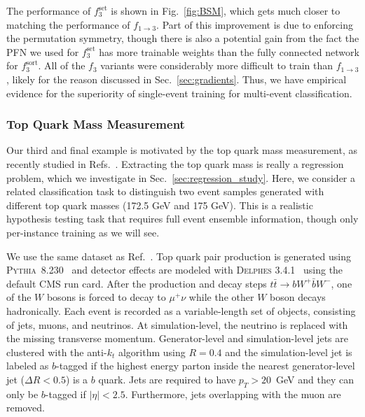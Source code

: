 \documentclass[aps,prx,reprint,preprintnumbers,superscriptaddress,nofootinbib,longbibliography,floatfix]{revtex4-2}
\DeclareRobustCommand{\Sec}[1]{Sec.~\ref{sec:#1}}
\DeclareRobustCommand{\Fig}[1]{Fig.~\ref{fig:#1}}
\DeclareRobustCommand{\Ref}[1]{Ref.~\cite{#1}}
\DeclareRobustCommand{\Refs}[1]{Refs.~\cite{#1}}
\begin{document}
The performance of $f^\text{set}_3$ is shown in \Fig{BSM}, which gets much closer to matching the performance of $f_{1\rightarrow 3}$.
%
Part of this improvement is due to enforcing the permutation symmetry, though there is also a potential gain from the fact the PFN we used for $f^\text{set}_3$ has more trainable weights than the fully connected network for $f^\text{sort}_3$.
%
All of the $f_3$ variants were considerably more difficult to train than $f_{1 \to 3}$, likely for the reason discussed in \Sec{gradients}.
%
Thus, we have empirical evidence for the superiority of single-event training for multi-event classification.
 

 
 \subsubsection{Top Quark Mass Measurement}
 \label{sec:manyfromone_top}


Our third and final example is motivated by the top quark mass measurement, as recently studied in \Refs{2010.03569,Flesher:2020kuy}.
%
Extracting the top quark mass is really a regression problem, which we investigate in \Sec{regression_study}.
%
Here, we consider a related classification task to distinguish two event samples generated with different top quark masses (172.5 GeV and 175 GeV).
%
This is a realistic hypothesis testing task that requires full event ensemble information, though only per-instance training as we will see.


We use the same dataset as \Ref{2010.03569}.
%
Top quark pair production is generated using \textsc{Pythia}~8.230~\cite{Sjostrand:2006za,Sjostrand:2007gs}
 and detector effects are modeled with \textsc{Delphes} 3.4.1~
\cite{deFavereau:2013fsa,Mertens:2015kba,Selvaggi:2014mya} using the default CMS run card.
%
After the production and decay steps $t\bar{t} \to b W^+ \bar{b} W^-$, one of the $W$ bosons is forced to decay to $\mu^+\nu$ while the other $W$ boson decays hadronically.
%
Each event is recorded as a variable-length set of objects, consisting of jets, muons, and neutrinos.
%
At simulation-level, the neutrino is replaced with the missing transverse momentum.
%
Generator-level and simulation-level jets are clustered with the anti-$k_t$ algorithm using $R=0.4$ and the simulation-level jet is labeled as $b$-tagged if the highest energy parton inside the nearest generator-level jet ($\Delta R < 0.5$) is a $b$ quark.
%
Jets are required to have $p_T>20$~GeV and they can only be $b$-tagged if $|\eta|<2.5$.
%
Furthermore, jets overlapping with the muon are removed.
\end{document}
